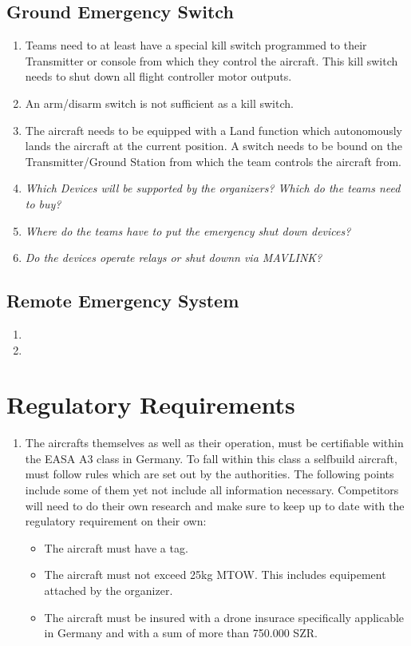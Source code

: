 \documentclass{article}
\begin{document}
\subsection{Ground Emergency Switch}
\begin{enumerate}
  \item Teams need to at least have a special kill switch programmed to their Transmitter or console from which they control the aircraft. This kill switch needs to shut down all flight controller motor outputs. 
  \item An arm/disarm switch is not sufficient as a kill switch.
  \item The aircraft needs to be equipped with a Land function which autonomously lands the aircraft at the current position. A switch needs to be bound on the Transmitter/Ground Station from which the team controls the aircraft from.  
  \item \emph{Which Devices will be supported by the organizers? Which do the teams need to buy?}
  \item \emph{Where do the teams have to put the emergency shut down devices?}
  \item \emph{Do the devices operate relays or shut downn via MAVLINK?}
\end{enumerate}


\subsection{Remote Emergency System}
\begin{enumerate}
  \item 
  \item 
\end{enumerate}

\section{Regulatory Requirements}
\begin{enumerate}
  \item The aircrafts themselves as well as their operation, must be certifiable within the EASA A3 class in Germany. To fall within this class a selfbuild aircraft, must follow rules which are set out by the authorities. 
  The following points include some of them yet not include all information necessary. Competitors will need to do their own research and make sure to keep up to date with the regulatory requirement on their own:
  \begin{itemize}
    \item The aircraft must have a tag.
    \item The aircraft must not exceed 25kg MTOW. This includes equipement attached by the organizer.
    \item The aircraft must be insured with a drone insurace specifically applicable in Germany and with a sum of more than 750.000 SZR. 
  \end{itemize}
\end{enumerate}
\end{document}
